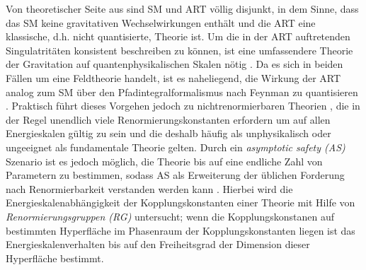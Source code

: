   Von theoretischer Seite aus sind SM und ART völlig disjunkt, in dem Sinne, 
  dass das SM keine gravitativen Wechselwirkungen enthält und die ART eine 
  klassische, d.h. nicht quantisierte, Theorie ist. Um die in der ART 
  auftretenden Singulatritäten konsistent beschreiben zu können, ist eine 
  umfassendere Theorie der Gravitation auf quantenphysikalischen Skalen nötig 
  \cite{GR_Introductory}. Da es sich in beiden 
  Fällen um eine Feldtheorie handelt, ist es naheliegend, die Wirkung der ART 
  analog zum SM über den Pfadintegralformalismus nach Feynman zu quantisieren 
  \cite{GR_Hawking}. Praktisch führt dieses Vorgehen jedoch zu 
  nichtrenormierbaren Theorien \cite{GR_Weinberg}, die in der Regel unendlich 
  viele Renormierungskonstanten erfordern um auf allen Energieskalen gültig 
  zu sein und die deshalb häufig als unphysikalisch oder ungeeignet als 
  fundamentale Theorie gelten. Durch ein \textit{asymptotic safety (AS)} 
  Szenario ist es jedoch möglich, die Theorie bis auf eine endliche Zahl von 
  Parametern zu bestimmen, sodass AS als Erweiterung der üblichen Forderung 
  nach Renormierbarkeit verstanden werden kann \cite{GR_Weinberg}
  \cite{Weinberg:1976}. Hierbei 
  wird die Energieskalenabhängigkeit der Kopplungskonstanten einer Theorie 
  mit Hilfe von \textit{Renormierungsgruppen (RG)} untersucht; wenn 
  die Kopplungskonstanen auf bestimmten Hyperfläche im Phasenraum der 
  Kopplungskonstanten liegen ist das Energieskalenverhalten bis auf den  
  Freiheitsgrad der Dimension dieser Hyperfläche bestimmt.
  
 
    